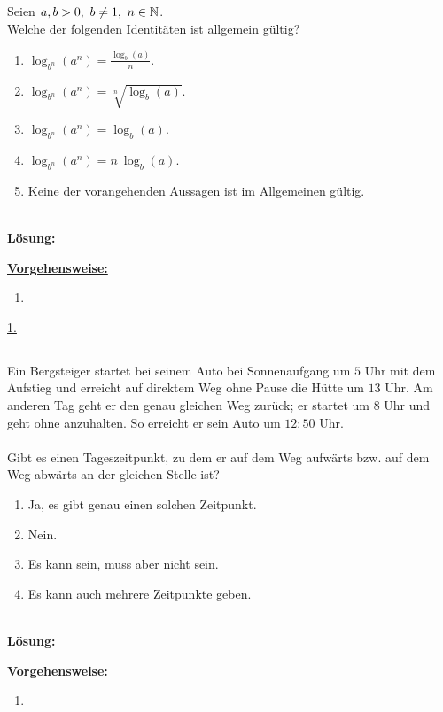 \subsection*{}
Seien $ a,b >0, \ b \neq 1 , \ n \in \mathbb{N}  $.\\
Welche der folgenden Identitäten ist allgemein gültig?
\renewcommand{\labelenumi}{(\alph{enumi})}
\begin{enumerate}
	\item 
	$ \log_{b^n}(a^n) = \frac{\log_{b}(a)}{n} $.
	\item 
	$ \log_{b^n}(a^n) = \sqrt[n]{\log_{b}(a)} $.
	\item
	$ \log_{b^n}(a^n) = \log_{b}(a) $.
	\item
	$ \log_{b^n}(a^n) = n \ \log_{b}(a) $.
	\item
	Keine der vorangehenden Aussagen ist im Allgemeinen gültig.
\end{enumerate}
\ \\
\textbf{Lösung:}
\begin{mdframed}
\underline{\textbf{Vorgehensweise:}}
\renewcommand{\labelenumi}{\theenumi.}
\begin{enumerate}
\item 
\end{enumerate}
\end{mdframed}

\underline{1. }\\


 \newpage

\subsection*{}
Ein Bergsteiger startet bei seinem Auto bei Sonnenaufgang um $ 5 $ Uhr mit dem Aufstieg und erreicht auf direktem Weg ohne Pause die Hütte um $ 13 $ Uhr.
Am anderen Tag geht er den genau gleichen Weg zurück; er startet um $ 8 $ Uhr und geht ohne anzuhalten. So erreicht er sein Auto um $ 12:50 $ Uhr.\\
\\
Gibt es einen Tageszeitpunkt, zu dem er auf dem Weg aufwärts bzw. auf dem Weg abwärts an der gleichen Stelle ist? 
\renewcommand{\labelenumi}{(\alph{enumi})}
\begin{enumerate}
	\item 
	Ja, es gibt genau einen solchen Zeitpunkt.
	\item 
	Nein.
	\item
	Es kann sein, muss aber nicht sein.
	\item
	Es kann auch mehrere Zeitpunkte geben.
\end{enumerate}
\ \\
\textbf{Lösung:}
\begin{mdframed}
\underline{\textbf{Vorgehensweise:}}
\renewcommand{\labelenumi}{\theenumi.}
\begin{enumerate}
\item

\end{enumerate}
\end{mdframed}

